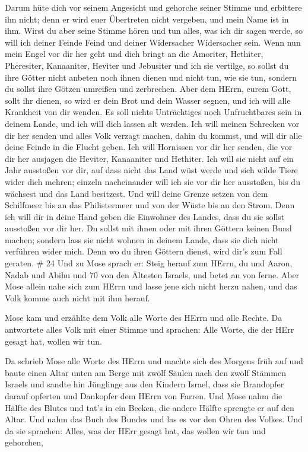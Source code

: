 Darum hüte dich vor seinem Angesicht und gehorche seiner
Stimme und erbittere ihn nicht; denn er wird euer Übertreten nicht
vergeben, und mein Name ist in ihm.  Wirst du aber seine
Stimme hören und tun alles, was ich dir sagen werde, so will ich deiner
Feinde Feind und deiner Widersacher Widersacher sein.  Wenn
nun mein Engel vor dir her geht und dich bringt an die Amoriter,
Hethiter, Pheresiter, Kanaaniter, Heviter und Jebusiter und ich sie
vertilge,  so sollst du ihre Götter nicht anbeten noch
ihnen dienen und nicht tun, wie sie tun, sondern du sollst ihre Götzen
umreißen und zerbrechen.  Aber dem HErrn, eurem Gott, sollt
ihr dienen, so wird er dein Brot und dein Wasser segnen, und ich will
alle Krankheit von dir wenden.  Es soll nichts Unträchtiges
noch Unfruchtbares sein in deinem Lande, und ich will dich lassen alt
werden.  Ich will meinen Schrecken vor dir her senden und
alles Volk verzagt machen, dahin du kommst, und will dir alle deine
Feinde in die Flucht geben.  Ich will Hornissen vor dir her
senden, die vor dir her ausjagen die Heviter, Kanaaniter und Hethiter.
 Ich will sie nicht auf ein Jahr ausstoßen vor dir, auf
dass nicht das Land wüst werde und sich wilde Tiere wider dich mehren;
 einzeln nacheinander will ich sie vor dir her ausstoßen,
bis du wächsest und das Land besitzest.  Und will deine
Grenze setzen von dem Schilfmeer bis an das Philistermeer und von der
Wüste bis an den Strom. Denn ich will dir in deine Hand geben die
Einwohner des Landes, dass du sie sollst ausstoßen vor dir her.
 Du sollst mit ihnen oder mit ihren Göttern keinen Bund
machen;  sondern lass sie nicht wohnen in deinem Lande,
dass sie dich nicht verführen wider mich. Denn wo du ihren Göttern
dienst, wird dir's zum Fall geraten. \# 24  Und zu Mose
sprach er: Steig herauf zum HErrn, du und Aaron, Nadab und Abihu und 70
von den Ältesten Israels, und betet an von ferne.  Aber Mose
allein nahe sich zum HErrn und lasse jene sich nicht herzu nahen, und
das Volk komme auch nicht mit ihm herauf.

 Mose kam und erzählte dem Volk alle Worte des HErrn und
alle Rechte. Da antwortete alles Volk mit einer Stimme und sprachen:
Alle Worte, die der HErr gesagt hat, wollen wir tun.

 Da schrieb Mose alle Worte des HErrn und machte sich des
Morgens früh auf und baute einen Altar unten am Berge mit zwölf Säulen
nach den zwölf Stämmen Israels  und sandte hin Jünglinge aus
den Kindern Israel, dass sie Brandopfer darauf opferten und Dankopfer
dem HErrn von Farren.  Und Mose nahm die Hälfte des Blutes
und tat's in ein Becken, die andere Hälfte sprengte er auf den Altar.
 Und nahm das Buch des Bundes und las es vor den Ohren des
Volkes. Und da sie sprachen: Alles, was der HErr gesagt hat, das wollen
wir tun und gehorchen,

